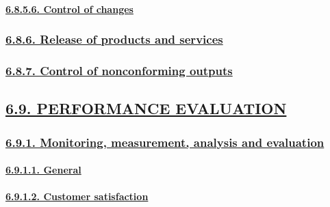 \documentclass[
]{article}
\begin{document}
\hypertarget{control-of-changes}{%
\paragraph{\texorpdfstring{\protect\hyperlink{control-of-changes-1}{6.8.5.6.
Control of
changes}}{6.8.5.6. Control of changes}}\label{control-of-changes}}

\hypertarget{release-of-products-and-services}{%
\subsubsection{\texorpdfstring{\protect\hyperlink{release-of-products-and-services-1}{6.8.6.
Release of products and
services}}{6.8.6. Release of products and services}}\label{release-of-products-and-services}}

\hypertarget{control-of-nonconforming-outputs}{%
\subsubsection{\texorpdfstring{\protect\hyperlink{control-of-nonconforming-outputs-1}{6.8.7.
Control of nonconforming
outputs}}{6.8.7. Control of nonconforming outputs}}\label{control-of-nonconforming-outputs}}

\hypertarget{performance-evaluation}{%
\subsection{\texorpdfstring{\protect\hyperlink{performance-evaluation-1}{6.9.
PERFORMANCE
EVALUATION}}{6.9. PERFORMANCE EVALUATION}}\label{performance-evaluation}}

\hypertarget{monitoring-measurement-analysis-and-evaluation}{%
\subsubsection{\texorpdfstring{\protect\hyperlink{monitoring-measurement-analysis-and-evaluation-1}{6.9.1.
Monitoring, measurement, analysis and
evaluation}}{6.9.1. Monitoring, measurement, analysis and evaluation}}\label{monitoring-measurement-analysis-and-evaluation}}

\hypertarget{general-6}{%
\paragraph{\texorpdfstring{\protect\hyperlink{general-15}{6.9.1.1.
General}}{6.9.1.1. General}}\label{general-6}}

\hypertarget{customer-satisfaction}{%
\paragraph{\texorpdfstring{\protect\hyperlink{customer-satisfaction-1}{6.9.1.2.
Customer
satisfaction}}{6.9.1.2. Customer satisfaction}}\label{customer-satisfaction}}
\end{document}
